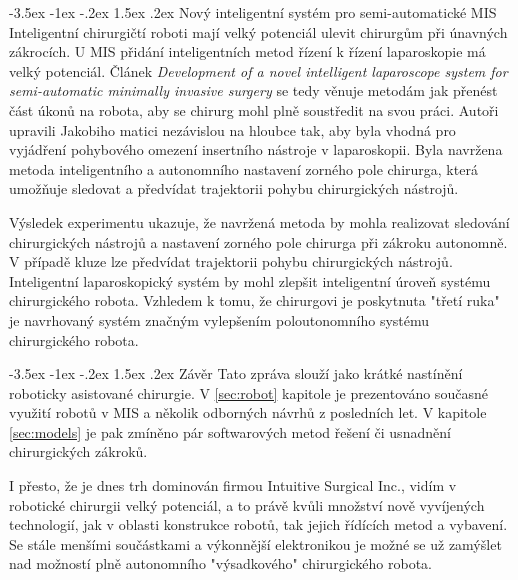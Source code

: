 \documentclass[10pt, a4paper]{article}
\makeatletter
\theoremstyle{definition}
\renewcommand\section{\@startsection {section}{1}{\z@}%
                                   {-3.5ex \@plus -1ex \@minus -.2ex}%
                                   {1.5ex \@plus.2ex}%
                                   {\large\bfseries}}
\renewcommand\subsection{\@startsection {subsection}{1}{\z@}%
                                   {-3.5ex \@plus -1ex \@minus -.2ex}%
                                   {1.5ex \@plus.2ex}%
                                   {\normalsize\bfseries}}
\makeatother
\begin{document}
\subsection{Nový inteligentní systém pro semi-automatické MIS} %
\label{subsec:automa}
Inteligentní chirurgičtí roboti mají velký potenciál ulevit
chirurgům při únavných zákrocích. U MIS přidání inteligentních
metod řízení k řízení laparoskopie má velký potenciál.
Článek \textit{Development of a novel intelligent laparoscope system for semi-automatic minimally invasive surgery} \cite{intelligent_system}
se tedy věnuje metodám jak přenést část úkonů na robota,
aby se chirurg mohl plně soustředit na svou práci.
Autoři upravili Jakobiho matici nezávislou na hloubce tak, aby
byla vhodná pro vyjádření pohybového omezení insertního nástroje v laparoskopii.
Byla navržena metoda inteligentního a autonomního nastavení
zorného pole chirurga, která umožňuje sledovat a předvídat
trajektorii pohybu chirurgických nástrojů.

Výsledek experimentu ukazuje, že navržená metoda by mohla
realizovat sledování chirurgických nástrojů a nastavení zorného
pole chirurga při zákroku autonomně. V případě kluze lze
předvídat trajektorii pohybu chirurgických nástrojů.
Inteligentní laparoskopický systém by mohl zlepšit inteligentní
úroveň systému chirurgického robota. Vzhledem k tomu,
že chirurgovi je poskytnuta "třetí ruka" je navrhovaný systém
značným vylepšením poloutonomního systému chirurgického robota.


\section{Závěr}
\label{sec:zaver}
Tato zpráva slouží jako krátké nastínění roboticky asistované chirurgie.
V \ref{sec:robot} kapitole  je prezentováno současné využití robotů v MIS
a několik odborných návrhů z posledních let. V kapitole \ref{sec:models}
je pak zmíněno pár softwarových metod řešení či usnadnění chirurgických zákroků.

I přesto, že je dnes trh dominován firmou Intuitive Surgical Inc.,
vidím v robotické chirurgii velký potenciál, a to právě kvůli množství
nově vyvíjených technologií, jak v oblasti konstrukce robotů, tak
jejich řídících metod a vybavení. Se stále menšími součástkami a výkonnější
elektronikou je možné se už zamýšlet nad možností plně autonomního
"výsadkového" chirurgického robota.


\newpage
\begingroup
\makeatletter
\renewcommand\section{\@startsection {section}{99}{\z@}%
                                   {-3.5ex \@plus -1ex \@minus -.2ex}%
                                   {4.5ex \@plus.2ex}%
                                   {\large\bfseries}}
\makeatother


{}

\endgroup
\end{document}
